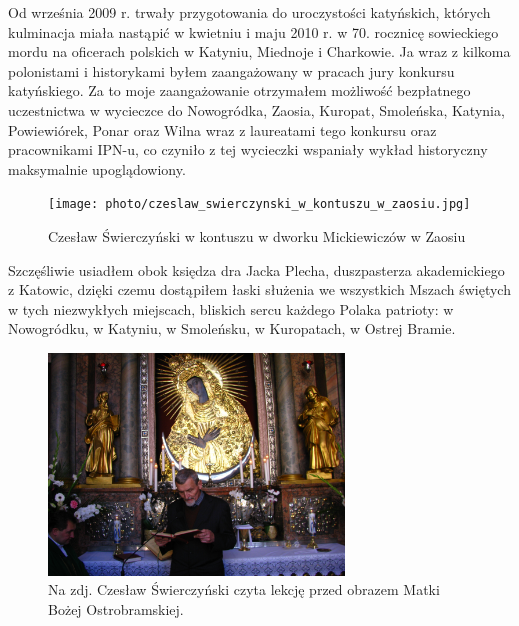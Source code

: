 Od września 2009 r. trwały przygotowania do uroczystości katyńskich, których kulminacja miała nastąpić w kwietniu i maju 2010 r. w 70. rocznicę  sowieckiego mordu na oficerach polskich w Katyniu, Miednoje i Charkowie. Ja wraz z kilkoma polonistami i historykami byłem zaangażowany w pracach jury konkursu katyńskiego. Za to moje zaangażowanie otrzymałem możliwość bezpłatnego uczestnictwa w wycieczce do Nowogródka, Zaosia, Kuropat, Smoleńska, Katynia, Powiewiórek, Ponar oraz Wilna wraz z laureatami tego konkursu oraz pracownikami IPN-u, co czyniło z tej wycieczki wspaniały wykład historyczny maksymalnie upoglądowiony.
\begin{figure}[!h]
\begin{center}
\texttt{[image: photo/czeslaw\_swierczynski\_w\_kontuszu\_w\_zaosiu.jpg]}
\caption[Czesław Świerczyński w kontuszu]{Czesław Świerczyński w kontuszu w dworku Mickiewiczów w Zaosiu}
\end{center}
\end{figure}

Szczęśliwie usiadłem obok księdza dra Jacka Plecha, duszpasterza akademickiego z Katowic, dzięki czemu dostąpiłem łaski służenia we wszystkich Mszach świętych w tych niezwykłych miejscach, bliskich sercu każdego Polaka patrioty: w Nowogródku, w Katyniu, w Smoleńsku, w Kuropatach, w Ostrej Bramie.
\begin{figure}[!h]
\begin{center}
\includegraphics[width=0.7\textwidth]{photo/czeslaw_swierczynski_ostra_brama.jpg}
\caption[Ostra Brama]{Na zdj. Czesław Świerczyński czyta lekcję przed obrazem Matki Bożej Ostrobramskiej.}
\end{center}
\end{figure}

